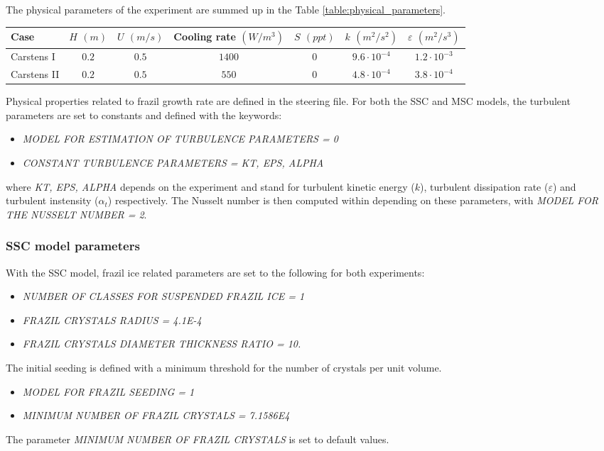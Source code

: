 The physical parameters of the experiment are summed up in the Table \ref{table:physical_parameters}.
\begin{center}
\begin{tabular}{lcccccc}
\hline
Case & $H$ $(m)$ & $U$ $(m/s)$ & Cooling rate $(W/m^3)$ & $S$ $(ppt)$ & $k$ $(m^2/s^2)$ & $\varepsilon$ $(m^2/s^3)$ \\
\hline \hline
Carstens I & $0.2$ & $0.5$ & $1400$ & $0$ & $9.6 \cdot 10^{-4}$ & $1.2 \cdot 10^{-3}$ \\
\hline
Carstens II & $0.2$ & $0.5$ & $550$ & $0$ & $4.8 \cdot 10^{-4}$ & $3.8 \cdot 10^{-4}$ \\
\hline
\end{tabular}
\label{table:physical_parameters}
\end{center}

Physical properties related to frazil growth rate are defined in the \khione steering file. 
For both the SSC and MSC models, the turbulent parameters are set to constants
and defined with the keywords:
\begin{itemize}
	\item\textit{MODEL FOR ESTIMATION OF TURBULENCE PARAMETERS = 0}
	\item\textit{CONSTANT TURBULENCE PARAMETERS = KT, EPS, ALPHA}
\end{itemize}
where \textit{KT, EPS, ALPHA} depends on the experiment and
stand for turbulent kinetic energy ($k$),
turbulent dissipation rate ($\varepsilon$) and 
turbulent instensity ($\alpha_t$) respectively.
The Nusselt number is then computed within \khione depending on these parameters, 
with \textit{MODEL FOR THE NUSSELT NUMBER = 2}.

\subsubsection{SSC model parameters}
With the SSC model, frazil ice related parameters are set to the following
for both experiments:
\begin{itemize}
	\item\textit{NUMBER OF CLASSES FOR SUSPENDED FRAZIL ICE = 1}
	\item\textit{FRAZIL CRYSTALS RADIUS = 4.1E-4}
	\item\textit{FRAZIL CRYSTALS DIAMETER THICKNESS RATIO = 10.}
\end{itemize}

The initial seeding is defined with a minimum threshold for the number of crystals per unit volume.
\begin{itemize}
  \item\textit{MODEL FOR FRAZIL SEEDING = 1}
  \item\textit{MINIMUM NUMBER OF FRAZIL CRYSTALS = 7.1586E4}
\end{itemize}
The parameter \textit{MINIMUM NUMBER OF FRAZIL CRYSTALS} is set to default values.


